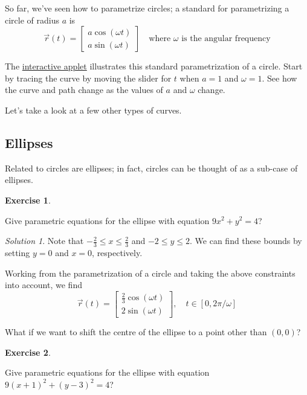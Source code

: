 \documentclass[
]{book}
\theoremstyle{definition}
\theoremstyle{definition}
\theoremstyle{definition}
\newtheorem{exercise}{Exercise}[chapter]
\theoremstyle{definition}
\theoremstyle{remark}
\newtheorem*{solution}{Solution}
\begin{document}
So far, we've seen how to parametrize circles; a standard for parametrizing a circle of radius \(a\) is \[\vec{r}(t)=\begin{bmatrix}a\cos(\omega t)\\ a\sin(\omega t)\end{bmatrix} \quad \mbox{where $\omega$ is the angular frequency}\]

The \href{https://www.geogebra.org/m/d7wfdtgt}{interactive applet} illustrates this standard parametrization of a circle. Start by tracing the curve by moving the slider for \(t\) when \(a=1\) and \(\omega=1\). See how the curve and path change as the values of \(a\) and \(\omega\) change.

Let's take a look at a few other types of curves.

\hypertarget{ellipses}{%
\subsection{Ellipses}\label{ellipses}}

Related to circles are ellipses; in fact, circles can be thought of as a sub-case of ellipses.

\begin{exercise}
\protect\hypertarget{exr:unlabeled-div-34}{}\label{exr:unlabeled-div-34}

Give parametric equations for the ellipse with equation \(9x^2+y^2=4\)?

\end{exercise}

\begin{solution}

Note that \(-\frac{2}{3}\leq x\leq \frac{2}{3}\) and \(-2\leq y \leq 2\). We can find these bounds by setting \(y=0\) and \(x=0\), respectively.

Working from the parametrization of a circle and taking the above constraints into account, we find \[\vec{r}(t)=\begin{bmatrix}\frac{2}{3}\cos(\omega t) \\ 2\sin(\omega t)\end{bmatrix}, \quad t\in [0, 2\pi/\omega]\]

\end{solution}

What if we want to shift the centre of the ellipse to a point other than \((0,0)\)?

\begin{exercise}
\protect\hypertarget{exr:unlabeled-div-36}{}\label{exr:unlabeled-div-36}

Give parametric equations for the ellipse with equation \(9(x+1)^2+(y-3)^2=4\)?

\end{exercise}
\end{document}
